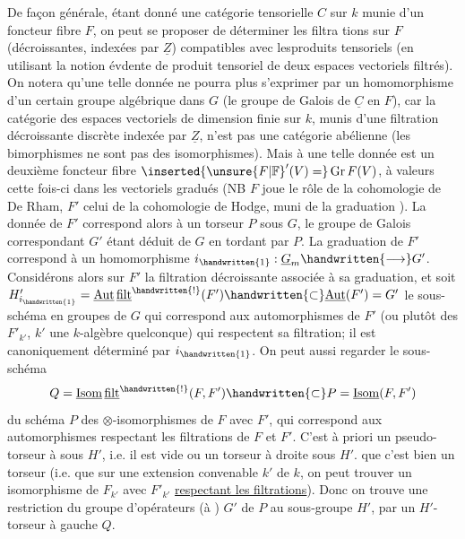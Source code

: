 De façon générale, étant donné une catégorie tensorielle $C$ sur $k$ munie d'un foncteur fibre $F$, on peut se proposer de déterminer les filtra%
%
tions sur $F$ (décroissantes,  indexées par $\underline{Z}$) compatibles avec lesproduits tensoriels (en utilisant la notion évdente de produit tensoriel de deux espaces vectoriels filtrés). On notera qu'une telle donnée ne pourra plus s'exprimer par un homomorphisme d'un certain groupe algébrique dans $G$ (le groupe de Galois de $\underline{C}$ en $F$), car la catégorie des espaces vectoriels de dimension finie sur $k$, munis d'une filtration décroissante discrète indexée par $\underline{Z}$, n'est pas une catégorie abélienne (les bimorphismes ne sont pas des isomorphismes\handwritten{!}). Mais à une telle donnée est  un deuxième foncteur fibre $\inserted{\unsure{F|\mathbb{F}}'(V)=}\operatorname{Gr}F(V)$, à valeurs cette fois-ci dans les vectoriels gradués (NB $F$ joue le rôle de la cohomologie de  De Rham, $F'$ celui de la cohomologie de Hodge\deleted{\unsure{)}}, muni de la graduation ). La donnée de $F'$ correspond alors à un torseur  $P$ sous $G$, le groupe de Galois correspondant $G'$ étant déduit de $G$ en tordant par $P$. La graduation de $F'$ correspond à un homomorphisme $i_{\handwritten{1}}:\underline{G}_m\handwritten{\longrightarrow}G'$. Considérons alors sur $F'$ la filtration décroissante associée à sa graduation, et soit $H'_{i_{\handwritten{1}}}=\underline{\operatorname{Aut}}\,\underline{\mathrm{filt}}^{\handwritten{!}}(F')\handwritten{\subset}\underline{\operatorname{Aut}}(F')=G'$ le sous-schéma en groupes de $G$ qui correspond aux \inserted{$\unsure{\otimes|\Omega}$-}automorphismes de $F'$ (ou plutôt des $F'_{k'}$, $k'$ une $k$-algèbre quelconque) qui respectent sa filtration; il est canoniquement déterminé par $i_{\handwritten{1}}$. On peut aussi regarder le sous-schéma
\[
Q=\underline{\operatorname{Isom}}\,\underline{\mathrm{filt}}^{\handwritten{!}}(F,F')\handwritten{\subset}P=\underline{\operatorname{Isom}}(F,F')
\]
du schéma $P$ des $\otimes$-isomorphismes de $F$ avec $F'$,  qui correspond aux automorphismes respectant les filtrations de $F$ et $F'$. C'est à priori un pseudo-torseur à  sous $H'$, i.e. il est vide ou un torseur à droite sous $H'$.  que c'est bien un torseur (i.e. que sur une extension convenable $k'$ de $k$, on peut trouver un isomorphisme de $F_{k'}$ avec $F'_{k'}$ \uline{respectant les filtrations}). Donc on trouve une restriction du groupe d'opérateurs (à ) $G'$ de $P$ au sous-groupe $H'$,
%
par un $H'$-torseur à gauche $Q$.

